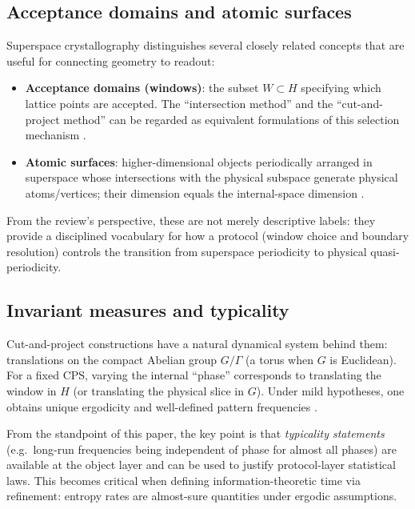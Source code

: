 \subsection{Acceptance domains and atomic surfaces}\label{sec:superspace:atomic}

Superspace crystallography distinguishes several closely related concepts that are useful for connecting geometry to readout:
\begin{itemize}[leftmargin=*,itemsep=2pt]
  \item \textbf{Acceptance domains (windows)}: the subset $W\subset H$ specifying which lattice points are accepted. The ``intersection method'' and the ``cut-and-project method'' can be regarded as equivalent formulations of this selection mechanism \cite{IUCRITCVolC}.
  \item \textbf{Atomic surfaces}: higher-dimensional objects periodically arranged in superspace whose intersections with the physical subspace generate physical atoms/vertices; their dimension equals the internal-space dimension \cite{IUCRAtomicSurface}.
\end{itemize}
From the review's perspective, these are not merely descriptive labels: they provide a disciplined vocabulary for how a protocol (window choice and boundary resolution) controls the transition from superspace periodicity to physical quasi-periodicity.

\subsection{Invariant measures and typicality}\label{sec:superspace:measures}

Cut-and-project constructions have a natural dynamical system behind them: translations on the compact Abelian group $G/\Gamma$ (a torus when $G$ is Euclidean). For a fixed CPS, varying the internal ``phase'' corresponds to translating the window in $H$ (or translating the physical slice in $G$). Under mild hypotheses, one obtains unique ergodicity and well-defined pattern frequencies \cite{Moody2000,Schlottmann2000GeneralizedModelSets,BaakeGrimm2013}.

From the standpoint of this paper, the key point is that \emph{typicality statements} (e.g.\ long-run frequencies being independent of phase for almost all phases) are available at the object layer and can be used to justify protocol-layer statistical laws. This becomes critical when defining information-theoretic time via refinement: entropy rates are almost-sure quantities under ergodic assumptions.


